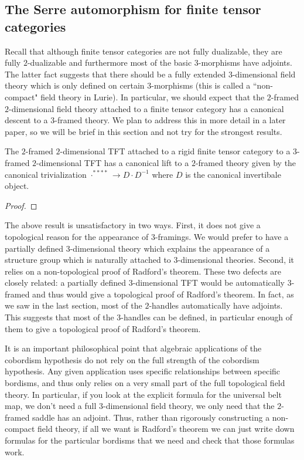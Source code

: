 \documentclass{amsart}
\begin{document}
\subsection{The Serre automorphism for finite tensor categories}

Recall that although finite tensor categories are not fully dualizable, they are fully $2$-dualizable and furthermore most of the basic $3$-morphisms have adjoints.  The latter fact suggests that there should be a fully extended $3$-dimensional field theory which is only defined on certain $3$-morphisms (this is called a ``non-compact" field theory in Lurie).  In particular, we should expect that the $2$-framed $2$-dimensional field theory attached to a finite tensor category has a canonical descent to a $3$-framed theory.  We plan to address this in more detail in a later paper, so we will be brief in this section and not try for the strongest results.

\begin{theorem}
The $2$-framed $2$-dimensional TFT attached to a rigid finite tensor category to a $3$-framed $2$-dimensional TFT has a canonical lift to a $2$-framed theory given by the canonical trivialization $\cdot^{****} \rightarrow D \cdot D^{-1}$ where $D$ is the canonical invertibale object.
\end{theorem}
\begin{proof}
\end{proof}

The above result is unsatisfactory in two ways.  First, it does not give a topological reason for the appearance of $3$-framings.  We would prefer to have a partially defined $3$-dimensional theory which explains the appearance of a structure group which is naturally attached to $3$-dimensional theories.  Second, it relies on a non-topological proof of Radford's theorem.  These two defects are closely related: a partially defined $3$-dimensional TFT would be automatically $3$-framed and thus would give a topological proof of Radford's theorem.  In fact, as we saw in the last section, most of the $2$-handles automatically have adjoints.  This suggests that most of the $3$-handles can be defined, in particular enough of them to give a topological proof of Radford's theorem.

It is an important philosophical point that algebraic applications of the cobordism hypothesis do not rely on the full strength of the cobordism hypothesis.  Any given application uses specific relationships between specific bordisms, and thus only relies on a very small part of the full topological field theory.  In particular, if you look at the explicit formula for the universal belt map, we don't need a full $3$-dimensional field theory, we only need that the $2$-framed saddle has an adjoint.  Thus, rather than rigorously constructing a non-compact field theory, if all we want is Radford's theorem we can just write down formulas for the particular bordisms that we need and check that those formulas work.
\end{document}
